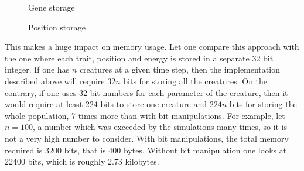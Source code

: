 \documentclass{article}
\begin{document}
\begin{figure}[!h]
\begin{center}
\caption{Gene storage}
\end{center}
\end{figure}
\begin{figure}[!h]
\begin{center}
\caption{Position storage}
\end{center}
\end{figure}

\newpage This makes a huge impact on memory usage. Let one compare this approach with the one where each trait, position and energy is stored in a separate 32 bit integer. If one has $n$ creatures at a given time step, then the implementation described above will require $32n$ bits for storing all the creatures. On the contrary, if one uses 32 bit numbers for each parameter of the creature, then it would require at least $224$ bits to store one creature and $224n$ bits for storing the whole population, 7 times more than with bit manipulations. For example, let $n = 100$, a number which was exceeded by the simulations many times, so it is not a very high number to consider. With bit manipulations, the total memory required is 3200 bits, that is 400 bytes. Without bit manipulation one looks at 22400 bits, which is roughly 2.73 kilobytes.
\end{document}
